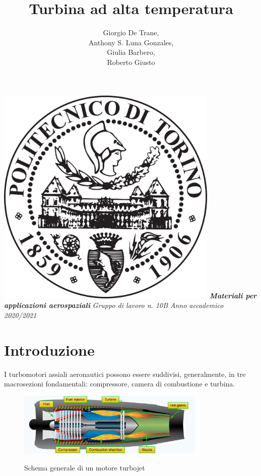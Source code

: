 \documentclass{article}
\author{Giorgio De Trane, \\Anthony S. Luna Gonzales, \\Giulia Barbero, \\Roberto Giusto}
\title{\textbf{Turbina ad alta temperatura}}
\begin{document}
    \setlength{\parindent}{0pt}
    \maketitle
    \begin{center}
        \includegraphics[width=0.8\textwidth]{Sources/polito_logo.png}\linebreak\newline
       \textbf{\textit{Materiali per applicazioni aerospaziali}}\linebreak\newline
        \textit{Gruppo di lavoro n. 10B}\linebreak\newline
        \textit{Anno accademico 2020/2021}
    \end{center}

    \newpage
    \tableofcontents
    \newpage
    \section{Introduzione\label{Intro}}
    I turbomotori assiali aeronautici possono essere suddivisi, generalmente, in tre macrosezioni
    fondamentali: compressore, camera di combustione e turbina.\\

    \begin{figure}[h!]
        \centering
        \includegraphics[width=0.8\textwidth]{Sources/turbojet.png}\\
    \caption{Schema generale di un motore turbojet \autocite*{turbojet}} 
    \end{figure}
\end{document}
